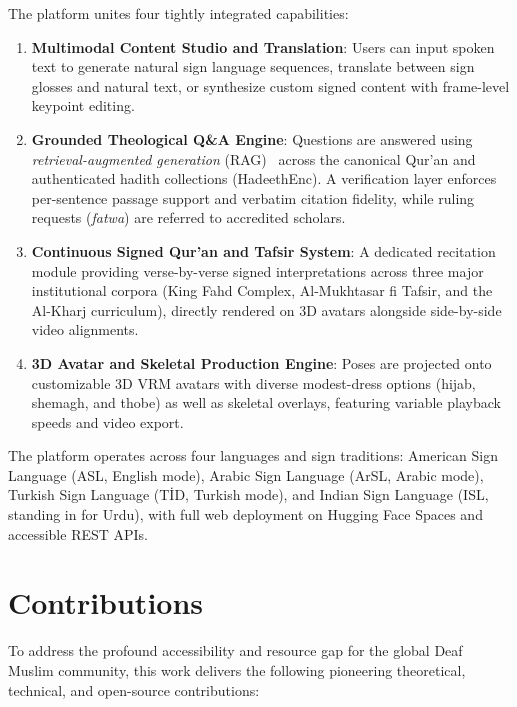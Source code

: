 The platform unites four tightly integrated capabilities:
\begin{enumerate}[leftmargin=*,itemsep=1pt]
  \item \textbf{Multimodal Content Studio and Translation}: Users can input spoken text to generate natural sign language sequences, translate between sign glosses and natural text, or synthesize custom signed content with frame-level keypoint editing.
  \item \textbf{Grounded Theological Q\&A Engine}: Questions are answered using \emph{retrieval-augmented generation} (RAG)~\cite{rag} across the canonical Qur'an and authenticated hadith collections (HadeethEnc). A verification layer enforces per-sentence passage support and verbatim citation fidelity, while ruling requests (\emph{fatwa}) are referred to accredited scholars.
  \item \textbf{Continuous Signed Qur'an and Tafsir System}: A dedicated recitation module providing verse-by-verse signed interpretations across three major institutional corpora (King Fahd Complex, Al-Mukhtasar fi Tafsir, and the Al-Kharj curriculum), directly rendered on 3D avatars alongside side-by-side video alignments.
  \item \textbf{3D Avatar and Skeletal Production Engine}: Poses are projected onto customizable 3D VRM avatars with diverse modest-dress options (hijab, shemagh, and thobe) as well as skeletal overlays, featuring variable playback speeds and video export.
\end{enumerate}
The platform operates across four languages and sign traditions: American Sign Language (ASL, English mode), Arabic Sign Language (ArSL, Arabic mode), Turkish Sign Language (T\.{I}D, Turkish mode), and Indian Sign Language (ISL, standing in for Urdu), with full web deployment on Hugging Face Spaces and accessible REST APIs.

\section{Contributions}

To address the profound accessibility and resource gap for the global Deaf Muslim community, this work delivers the following pioneering theoretical, technical, and open-source contributions:

